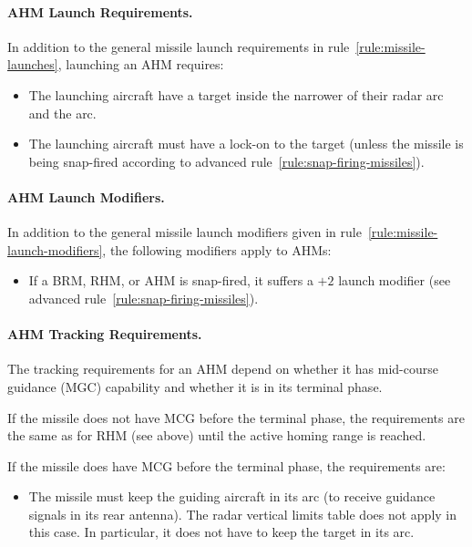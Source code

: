{\paragraph{AHM Launch Requirements.}\label{rule:ahm-launch-requirements} In addition to the general missile launch requirements in rule~\ref{rule:missile-launches}, launching an AHM requires:

\begin{itemize}

    \item The launching aircraft have a target inside the narrower of their radar arc and the  arc.

    \item The launching aircraft must have a lock-on to the target (unless the missile is being snap-fired according to advanced rule~\ref{rule:snap-firing-missiles}).

\end{itemize}

\paragraph{AHM Launch Modifiers.}
\label{rule:ahm-launch-modifiers}

In addition to the general missile launch modifiers given in rule~\ref{rule:missile-launch-modifiers}, the following modifiers apply to AHMs:

\begin{itemize}
    \item If a BRM, RHM, or AHM is snap-fired, it suffers a $+2$ launch modifier (see advanced rule~\ref{rule:snap-firing-missiles}).
\end{itemize}

\paragraph{AHM Tracking Requirements.} The tracking requirements for an AHM depend on whether it has mid-course guidance (MGC) capability and whether it is in its terminal phase.

If the missile does not have MCG before the terminal phase, the requirements are the same as for RHM (see above) until the active homing range is reached.


If the missile does have MCG before the terminal phase, the requirements are:
\begin{itemize}
    \item The missile must keep the guiding aircraft in its  arc (to receive guidance signals in its rear antenna). The radar vertical limits table does not apply in this case. In particular, it does not have to keep the target in its  arc.
\end{itemize}

}
